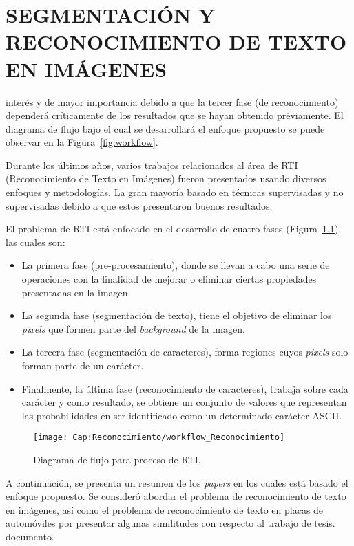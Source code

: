 \chapter{SEGMENTACIÓN Y RECONOCIMIENTO DE TEXTO EN IMÁGENES}
\label{cap-reconocimiento}
\setcounter{secnumdepth}{0}
interés y de mayor importancia debido a que la tercer fase (de reconocimiento)
dependerá críticamente de los resultados que se hayan obtenido préviamente. El
diagrama de flujo bajo el cual se desarrollará el enfoque propuesto se puede
observar en la Figura~\ref{fig:workflow}.

Durante los últimos años, varios trabajos relacionados al área de RTI
(Reconocimiento de Texto en Imágenes) fueron presentados usando diversos
enfoques y metodologías. La gran mayoría basado en técnicas supervisadas y no
supervisadas debido a que estos presentaron buenos resultados.%

El problema de RTI está enfocado en el desarrollo de cuatro fases
(Figura~\ref{fig:cap-reconocimiento:workflowtodo}), las cuales son:
\begin{itemize}
	\item La primera fase (pre-procesamiento), donde se llevan a cabo una serie de
operaciones con la finalidad de mejorar o eliminar ciertas propiedades
presentadas en la imagen.
	\item La segunda fase (segmentación de texto), tiene el objetivo de eliminar
los \textit{pixels} que formen parte del \textit{background} de la imagen.
	\item La tercera fase (segmentación de caracteres), forma regiones cuyos
\textit{pixels} solo forman parte de un carácter.
	\item Finalmente, la última fase (reconocimiento de caracteres), trabaja sobre
cada carácter y como resultado, se obtiene un conjunto de valores que
representan las probabilidades en ser identificado como un determinado carácter
ASCII.
\end{itemize}

\begin{figure}[h!]
	\centering
	\texttt{[image: Cap:Reconocimiento/workflow\_Reconocimiento]}
	\caption{Diagrama de flujo para proceso de RTI.}
	\label{fig:cap-reconocimiento:workflowtodo}
\end{figure}

A continuación, se presenta un resumen de los \textit{papers} en los cuales está
basado el enfoque propuesto. Se consideró abordar el problema de reconocimiento
de texto en imágenes, así como el problema de reconocimiento de texto en placas
de automóviles por presentar algunas similitudes con respecto al trabajo de
tesis.%
documento.

